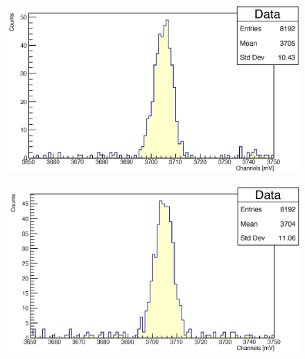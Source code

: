 \documentclass[a4paper,10pt]{article}
\begin{document}
\begin{figure}[H]
    \centering
    \includegraphics[scale=0.45]{appendice/spettri/ThA_1460_16}
\end{figure}
\begin{figure}[H]
    \centering
    \includegraphics[scale=0.45]{appendice/spettri/ThA_1460_20}
\end{figure}
\end{document}
